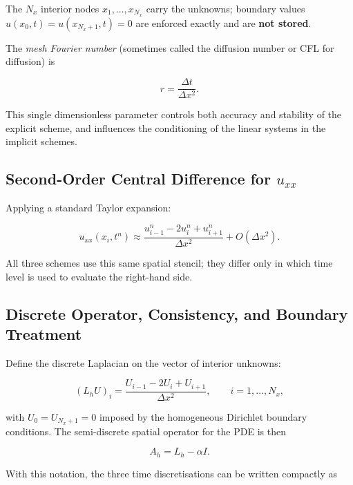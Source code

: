 \documentclass[11pt,a4paper]{article}
\begin{document}
The $N_x$ interior nodes $x_1,\ldots,x_{N_x}$ carry the unknowns; boundary values $u(x_0,t) = u(x_{N_x+1},t) = 0$ are enforced exactly and are \textbf{not stored}.

The \emph{mesh Fourier number} (sometimes called the diffusion number or CFL for diffusion) is

\begin{equation}
r = \frac{\Delta t}{\Delta x^2}. \tag{15}
\end{equation}

This single dimensionless parameter controls both accuracy and stability of the explicit scheme, and influences the conditioning of the linear systems in the implicit schemes.

\subsection{Second-Order Central Difference for $u_{xx}$}

Applying a standard Taylor expansion:

\begin{equation}
u_{xx}(x_i, t^n) \approx \frac{u_{i-1}^n - 2u_i^n + u_{i+1}^n}{\Delta x^2} + O(\Delta x^2). \tag{16}
\end{equation}

All three schemes use this same spatial stencil; they differ only in which time level is used to evaluate the right-hand side.

\subsection{Discrete Operator, Consistency, and Boundary Treatment}

Define the discrete Laplacian on the vector of interior unknowns:

\begin{equation}
\left(L_h U\right)_i = \frac{U_{i-1}-2U_i+U_{i+1}}{\Delta x^2}, \qquad i=1,\ldots,N_x, \tag{17}
\end{equation}

with $U_0=U_{N_x+1}=0$ imposed by the homogeneous Dirichlet boundary conditions. The semi-discrete spatial operator for the PDE is then

\begin{equation}
A_h = L_h - \alpha I. \tag{18}
\end{equation}

With this notation, the three time discretisations can be written compactly as
\end{document}
